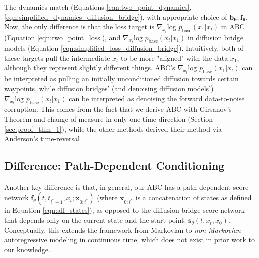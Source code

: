 \documentclass{article}
\begin{document}
The dynamics match (Equations \ref{eqn:two_point_dynamics}, \ref{eqn:simplified_dynamics_diffusion_bridge}), with appropriate choice of $\mathbf{b_\theta}, \mathbf{f_\theta}$.
Now, the only difference is that the loss target is $\nabla_{x_t}\text{log }p_\text{base}(x_1 | x_t)$ in ABC (Equation \ref{eqn:two_point_loss}), and $\nabla_{x_t}\text{log }p_\text{base}(x_t | x_1)$ in diffusion bridge models (Equation \ref{eqn:simplified_loss_diffusion_bridge}). Intuitively, both of these targets pull the intermediate $x_t$ to be more "aligned" with the data $x_1$, although they represent slightly different things. ABC's $\nabla_{x_t}\text{log }p_\text{base}(x_1 | x_t)$ can be interpreted as pulling an initially unconditioned diffusion towards certain waypoints, while diffusion bridges' (and denoising diffusion models') $\nabla_{x_t}\text{log }p_\text{base}(x_t | x_1)$ can be interpreted as denoising the forward data-to-noise corruption.
This comes from the fact that we derive ABC with Girsanov's Theorem and change-of-measure \cite{girsanov1960transforming, doob1984classical} in only one time direction (Section \ref{sec:proof_thm_1}), while the other methods derived their method via Anderson's time-reversal \cite{anderson1982reverse, zhou2023denoising, song2020score}.

\subsection{Difference: Path-Dependent Conditioning}

Another key difference is that, in general, our ABC has a path-dependent score network $\mathbf{f}_\theta(t,t_{i^*+1},x_t;\mathbf{x}_{0:i^*})$ (where $\mathbf{x}_{0:i^*}$ is a concatenation of states as defined in Equation \ref{eqn:all_states}), as opposed to the diffusion bridge score network that depends only on the current state and the start point: $\mathbf{s}_\theta(t, x_t, x_0)$. Conceptually, this extends the framework from Markovian to \textit{non-Markovian} autoregressive modeling in continuous time, which does not exist in prior work to our knowledge.
\end{document}

